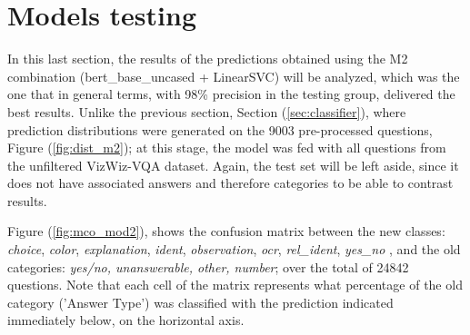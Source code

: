 \section{Models testing}
\label{sec:models_testing}
In this last section, the results of the predictions obtained using the M2 combination (bert\_base\_uncased + LinearSVC) will be analyzed, which was the one that in general terms, with 98\% precision in the testing group, delivered the best results. Unlike the previous section, Section (\ref{sec:classifier}), where prediction distributions were generated on the 9003 pre-processed questions, Figure (\ref{fig:dist_m2}); at this stage, the model was fed with all questions from the unfiltered VizWiz-VQA dataset. Again, the test set will be left aside, since it does not have associated answers and therefore categories to be able to contrast results.

Figure (\ref{fig:mco_mod2}), shows the confusion matrix between the new classes:
\emph{choice}, \emph{color}, \emph{explanation}, \emph{ident}, \emph{observation}, \emph{ocr}, \emph{rel\_ident}, \emph{yes\_no }, and the old categories: \emph {yes/no, unanswerable, other, number}; over the total of 24842 questions. Note that each cell of the matrix represents what percentage of the old category ('Answer Type') was classified with the prediction indicated immediately below, on the horizontal axis.

